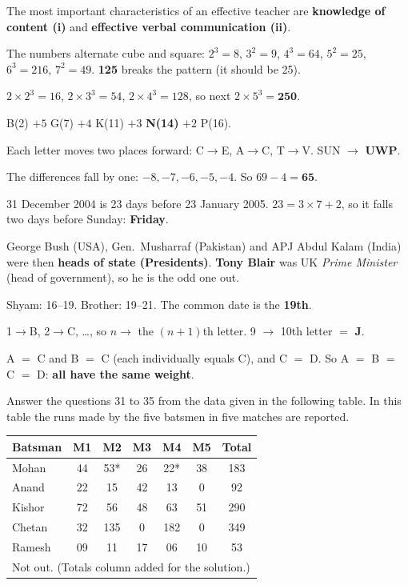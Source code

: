 The most important characteristics of an effective teacher are \textbf{knowledge of content (i)} and \textbf{effective verbal communication (ii)}.

The numbers alternate cube and square: $2^3=8$, $3^2=9$, $4^3=64$, $5^2=25$, $6^3=216$, $7^2=49$. \textbf{125} breaks the pattern (it should be 25).

$2\times2^3=16$, $2\times3^3=54$, $2\times4^3=128$, so next $2\times5^3=\mathbf{250}$.

B(2) $+5$ G(7) $+4$ K(11) $+3$ \textbf{N(14)} $+2$ P(16).

Each letter moves two places forward: C$\rightarrow$E, A$\rightarrow$C, T$\rightarrow$V. SUN $\rightarrow$ \textbf{UWP}.

The differences fall by one: $-8, -7, -6, -5, -4$. So $69-4=\mathbf{65}$.

31 December 2004 is 23 days before 23 January 2005. $23=3\times7+2$, so it falls two days before Sunday: \textbf{Friday}.

George Bush (USA), Gen.\ Musharraf (Pakistan) and APJ Abdul Kalam (India) were then \textbf{heads of state (Presidents)}. \textbf{Tony Blair} was UK \emph{Prime Minister} (head of government), so he is the odd one out.

Shyam: 16--19. Brother: 19--21. The common date is the \textbf{19th}.

1$\rightarrow$B, 2$\rightarrow$C, \ldots, so $n\rightarrow$ the $(n+1)$th letter. 9 $\rightarrow$ 10th letter $=$ \textbf{J}.

A $=$ C and B $=$ C (each individually equals C), and C $=$ D. So A $=$ B $=$ C $=$ D: \textbf{all have the same weight}.

Answer the questions 31 to 35 from the data given in the following table. In this table the runs made by the five batsmen in five matches are reported.
\begin{center}\small
\begin{tabular}{lccccc|c}\toprule \textbf{Batsman} & M1 & M2 & M3 & M4 & M5 & \textbf{Total}\\\midrule
Mohan & 44 & 53* & 26 & 22* & 38 & 183\\ Anand & 22 & 15 & 42 & 13 & 0 & 92\\ Kishor & 72 & 56 & 48 & 63 & 51 & 290\\ Chetan & 32 & 135 & 0 & 182 & 0 & 349\\ Ramesh & 09 & 11 & 17 & 06 & 10 & 53\\\bottomrule
\multicolumn{7}{l}{\scriptsize * Not out. (Totals column added for the solution.)}
\end{tabular}
\end{center}

